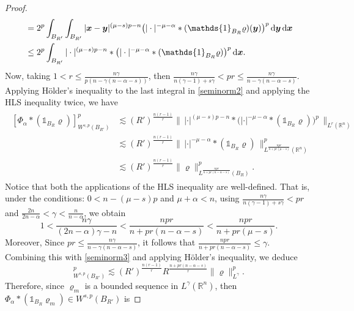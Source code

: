 \documentclass[reqno,11pt]{amsart}
\numberwithin{equation}{section}
\theoremstyle{definition}
\def\dd{{\, \rm d}}
\begin{document}
\begin{proof}
\begin{align}
\begin{split}
 & = 2^p \int_{B_{R'}} \int_{B_{R'}} |\boldsymbol{x} - \boldsymbol{y}|^{(\mu -s)p - n} \big ( |\cdot|^{-\mu - \alpha}*(\mathds{1}_{B_R}\varrho) (\boldsymbol{y}) \big )^p \dd \boldsymbol{y} \dd \boldsymbol{x} \\
 & \leq 2^p \int_{B_{R'}} |\cdot|^{(\mu -s)p - n} * \big (|\cdot|^{-\mu - \alpha}*(\mathds{1}_{B_R}\varrho) \big )^p \dd \boldsymbol{x}.
\end{split}
\end{align}
Now, taking $1 < r \leq \frac{n \gamma}{p(n - \gamma(n-\alpha-s))}$, then
$\frac{n\gamma}{n(\gamma - 1) + s\gamma} < pr \leq \frac{n \gamma}{n - \gamma(n - \alpha - s)}$. Applying H\"older's inequality to the last integral in \eqref{seminorm2} and applying the HLS inequality twice, we have
 \begin{align}\label{seminorm3}
 \begin{split}
[\Phi_\alpha*(\mathds{1}_{B_R}\varrho)]_{W^{s,p}(B_{R'})}^p & \lesssim (R')^\frac{n(r-1)}{r} \big \| \, |\cdot|^{(\mu -s)p - n} * \big (|\cdot|^{-\mu - \alpha}*(\mathds{1}_{B_R}\varrho) \big )^p \, \big \|_{L^r(\mathbb{R}^n)} \\
 & \lesssim (R')^\frac{n(r-1)}{r} \big \| \, |\cdot|^{-\mu - \alpha}*(\mathds{1}_{B_R}\varrho) \, \big \|_{L^\frac{npr}{n + pr(\mu -s)}(\mathbb{R}^n)}^p \\
 & \lesssim (R')^\frac{n(r-1)}{r} \| \varrho \|_{L^\frac{npr}{n + pr(n - \alpha - s)}(B_R)}^p.
 \end{split}
\end{align}
 Notice that both the applications of the HLS inequality are well-defined. That is,
 under the conditions: $0 < n - (\mu -s)p$ and $\mu + \alpha < n$, using 
 $\frac{n\gamma}{n(\gamma - 1) + s\gamma} < pr$ and $\frac{2n}{2n - \alpha} < \gamma < \frac{n}{n-\alpha}$, we obtain
 \[
 1 < \frac{n\gamma}{(2n - \alpha)\gamma - n} < \frac{npr}{n + pr(n - \alpha - s)} < \frac{npr}{n + pr(\mu -s)}.
\] 
Moreover, Since $pr \leq \frac{n \gamma}{n - \gamma(n - \alpha - s)}$, 
it follows that $\frac{npr}{n + pr(n - \alpha - s)} \leq \gamma$. 
Combining this with \eqref{seminorm3} and applying H\"older's inequality, we deduce
 \begin{equation*}
 [\Phi_\alpha*(\mathds{1}_{B_R}\varrho)]_{W^{s,p}(B_{R'})}^p \lesssim (R')^\frac{n(r-1)}{r} R^\frac{n + pr(n - \alpha - s)}{r} \| \varrho \|_{L^\gamma}^p.
\end{equation*} 
Therefore, since $\varrho_m$ is a bounded sequence in $L^\gamma(\mathbb{R}^n)$, 
then $\Phi_\alpha * (\mathds{1}_{B_R} \varrho_m ) \in W^{s,p}(B_{R'})$ is 

\end{proof}
\end{document}
